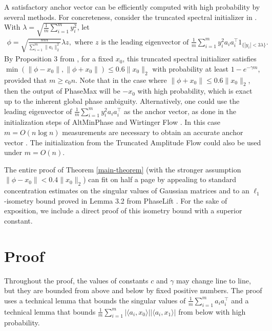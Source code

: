 \documentclass[12pt]{article}
\newcommand{\1}{\mathbf{1}}
\begin{document}
A satisfactory anchor vector can be efficiently computed with high probability by several methods.  For concreteness, consider the truncated spectral initializer in \cite{twf}.  With $\lambda = \sqrt{\frac{1}{m} \sum_{i=1}^m y_i^2}$,
 let 
 \begin{align}
 \phi = \sqrt{\frac{mn}{\sum_{i=1}^m \|a_i\|_2^2}} \lambda z, \text{ where $z$ is the leading eigenvector of }
\frac{1}{m}\sum_{i=1}^m y_i^2 a_i a_i^\intercal 1_{\{|y_i| < 3 \lambda \}}. \label{eq:initializer}
\end{align}
By Proposition 3 from \cite{twf}, for a fixed $x_0$, this truncated spectral initializer satisfies $\min (\|\phi - x_0\|, \|\phi + x_0\|) \leq 0.6 \|x_0\|_2$ with probability at least $1 - e^{-\gamma m}$, provided that $m \geq c_0 n$.   Note that in the case where $\|\phi + x_0\| \leq 0.6 \|x_0\|_2$, then the output of PhaseMax will be $-x_0$ with high probability, which is exact up to the inherent global phase ambiguity.  Alternatively, one could use the leading eigenvector of $\frac{1}{m} \sum_{i=1}^m y_i^2 a_i a_i^\intercal$ as the anchor vector, as done in the initialization steps of AltMinPhase \cite{altminphase}  and Wirtinger Flow \cite{wirtinger}.  In this case $m = O (n \log n)$ measurements are necessary to obtain an accurate anchor vector \cite{twf}.    The initialization from the Truncated Amplitude Flow \cite{yoninaTAF} could also be used under $m = O(n)$.

The entire proof of Theorem \ref{main-theorem} (with the stronger assumption $\|\phi - x_0\| < 0.4 \|x_0\|_2$) can fit on half a page by appealing to standard concentration estimates on the singular values of Gaussian matrices and to an $\ell_1$-isometry bound proved in Lemma 3.2 from PhaseLift \cite{CSV2013}.  For the sake of exposition, we include a direct proof of this isometry bound with a superior constant.


\section{Proof}
Throughout the proof, the values of constants $c$ and $\gamma$ may change line to line, but they are bounded from above and below by fixed positive numbers.  The proof uses a technical lemma that bounds the singular values of $\frac{1}{m} \sum_{i=1}^m a_i a_i^\intercal$ and a technical lemma that bounds $\frac{1}{m} \sum_{i=1}^m |\langle a_i, x_0\rangle| |\langle a_i, x_1\rangle|$ from below with high probability. 
\end{document}
